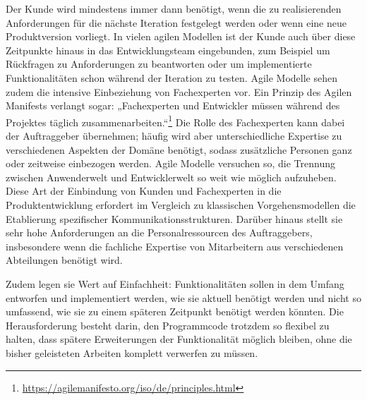 Der Kunde wird mindestens immer dann benötigt, wenn die zu realisierenden Anforderungen für die nächste Iteration festgelegt werden oder wenn eine neue Produktversion vorliegt. In vielen agilen Modellen ist der Kunde auch über diese Zeitpunkte hinaus in das Entwicklungsteam eingebunden, zum Beispiel um Rückfragen zu Anforderungen zu beantworten oder um implementierte Funktionalitäten schon während der Iteration zu testen. Agile Modelle sehen zudem die intensive Einbeziehung von Fachexperten vor. Ein Prinzip des Agilen Manifests verlangt sogar: „Fachexperten und Entwickler müssen während des Projektes täglich zusammenarbeiten.“\footnote{\href{https://agilemanifesto.org/iso/de/principles.html}{https://agilemanifesto.org/iso/de/principles.html}}
Die Rolle des Fachexperten kann dabei der Auftraggeber übernehmen; häufig wird aber unterschiedliche Expertise zu verschiedenen Aspekten der Domäne benötigt, sodass zusätzliche Personen ganz oder zeitweise einbezogen werden. Agile Modelle versuchen so, die Trennung zwischen Anwenderwelt und Entwicklerwelt so weit wie möglich aufzuheben. Diese Art der Einbindung von Kunden und Fachexperten in die Produktentwicklung erfordert im Vergleich zu klassischen Vorgehensmodellen die Etablierung spezifischer Kommunikationsstrukturen. Darüber hinaus stellt sie sehr hohe Anforderungen an die Personalressourcen des Auftraggebers, insbesondere wenn die fachliche Expertise von Mitarbeitern aus verschiedenen Abteilungen benötigt wird.

\vspace{1mm} %

Zudem legen sie Wert auf Einfachheit: Funktionalitäten sollen in dem Umfang entworfen und implementiert werden, wie sie aktuell benötigt werden und nicht so umfassend, wie sie zu einem späteren Zeitpunkt benötigt werden könnten. Die Herausforderung besteht darin, den Programmcode trotzdem so flexibel zu halten, dass spätere Erweiterungen der Funktionalität möglich bleiben, ohne die bisher geleisteten Arbeiten komplett verwerfen zu müssen.

\vspace{1mm} %

